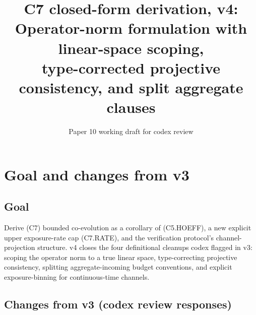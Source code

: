 \documentclass{article}
\title{C7 closed-form derivation, v4: \\
Operator-norm formulation with linear-space scoping, \\
type-corrected projective consistency, and split aggregate clauses}
\author{Paper 10 working draft for codex review}
\date{}
\begin{document}
\maketitle

\section{Goal and changes from v3}

\subsection{Goal}

Derive (C7) bounded co-evolution as a corollary of (C5.HOEFF), a
new explicit upper exposure-rate cap (C7.RATE), and the
verification protocol's channel-projection structure.  v4 closes
the four definitional cleanups codex flagged in v3: scoping the
operator norm to a true linear space, type-correcting projective
consistency, splitting aggregate-incoming budget conventions, and
explicit exposure-binning for continuous-time channels.

\subsection{Changes from v3 (codex review responses)}
\end{document}
